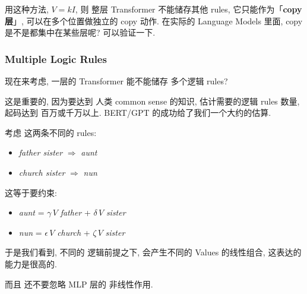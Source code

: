 \begin{preview}
\begin{minipage}{\textwidth}
用这种方法, $V = k I$, 则 整层 Transformer 不能储存其他 rules, 它只能作为「\textbf{copy 层}」, 可以在多个位置做独立的 copy 动作.  在实际的 Language Models 里面, copy 是不是都集中在某些层呢?  可以验证一下.

\subsubsection{Multiple Logic Rules}

现在来考虑, 一层的 Transformer 能不能储存 多个逻辑 rules?

这是重要的, 因为要达到 人类 common sense 的知识, 估计需要的逻辑 rules 数量, 起码达到 百万或千万以上.  BERT/GPT 的成功给了我们一个大约的估算.

考虑 这两条不同的 rules:
\begin{itemize}
	\item \textit{father {\color{red}sister}} $\Rightarrow$ \textit{aunt}
	\item \textit{church {\color{red}sister}} $\Rightarrow$ \textit{nun}
\end{itemize}
这等于要约束:
\begin{itemize}
	\item \textit{aunt} = $\gamma \, V$ \textit{father} + $\delta \, V$ \textit{sister}
	\item \textit{nun} = $\epsilon \, V$ \textit{church} + $\zeta \, V$ \textit{sister}
\end{itemize}
于是我们看到, 不同的 逻辑前提之下, 会产生不同的 Values 的线性组合, 这表达的能力是很高的.

而且 还不要忽略 MLP 层的 非线性作用.

\end{minipage}
\end{preview}

